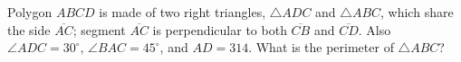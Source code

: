 Polygon $ABCD$ is made of two right triangles, $\triangle ADC$ and $\triangle ABC$, which share the side $\overline{AC}$; segment $\overline{AC}$ is perpendicular to both $\overline{CB}$ and $\overline{CD}$. Also $\angle ADC=30^\circ$, $\angle BAC=45^\circ$, and $AD=314$. What is the perimeter of $\triangle ABC$?
